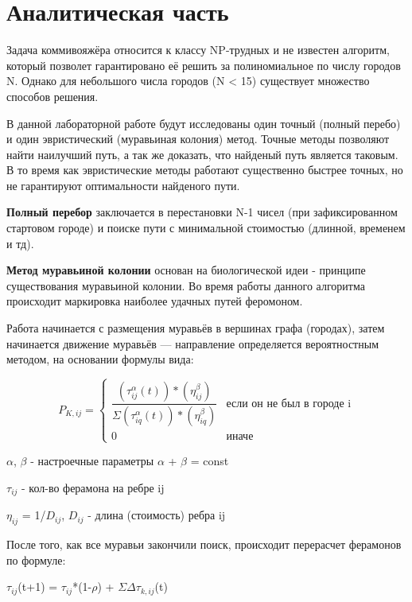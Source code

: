 \documentclass[12pt]{report}
\begin{document}
	\chapter{Аналитическая часть}
	Задача коммивояжёра относится к классу NP-трудных и не известен алгоритм, который позволет гарантировано её решить за полиномиальное по числу городов N. Однако для небольшого числа городов (N < 15) существует множество способов решения.
	
	В данной лабораторной работе будут исследованы один точный (полный перебо) и один эвристический (муравьиная колония) метод.
	Точные методы позволяют найти наилучший путь, а так же доказать, что найденый путь является таковым.
	В то время как эвристические методы работают существенно быстрее точных, но не гарантируют оптимальности найденого пути.
	
	\textbf{Полный перебор} заключается в перестановки N-1 чисел (при зафиксированном стартовом городе) и поиске пути с минимальной стоимостью (длинной, временем и тд).
	
	\textbf{Метод муравьиной колонии} основан на биологической идеи - принципе существования муравьиной колонии.
	Во время работы данного алгоритма происходит маркировка наиболее удачных путей феромоном.
	
	Работа начинается с размещения муравьёв в вершинах графа (городах), затем начинается движение муравьёв — направление определяется вероятностным методом, на основании формулы вида:

	\begin{displaymath}
		P_{K, ij} = \left\{ \begin{array}{ll}
		\dfrac{(\tau_{ij}^\alpha(t))*(\eta_{ij}^\beta)}{\Sigma(\tau_{iq}^\alpha(t))*(\eta_{iq}^\beta)}
		& \textrm{если он не был в городе i}\\ 
		0 & \textrm{иначе}
		\end{array} \right.
	\end{displaymath}
	
		$\alpha$, $\beta$ - настроечные параметры
		$\alpha$ + $\beta$  = const
		
		$\tau_{ij}$ - кол-во ферамона на ребре ij
		
		$\eta_{ij}$ = 1/{$D_{ij}$}, {$D_{ij}$} - длина (стоимость) ребра ij
		
	После того, как все муравьи закончили поиск, происходит перерасчет ферамонов по формуле:
	\begin{center}
		$\tau_{ij}$(t+1) = $\tau_{ij}$*(1-$\rho$) + $\Sigma$$\Delta$$\tau_{k,ij}$(t)
	\end{center}
\end{document}
